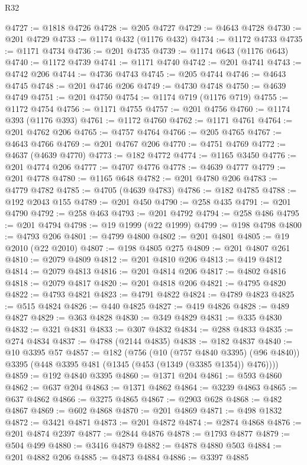 \begin{lexlean}{R32}
\begin{coremodule}
@4727 := @1818 @4726
@4728 := @205 @4727
@4729 := @4643 @4728
@4730 := @201 @4729
@4733 := @1174 @432 (@1176 @432)
@4734 := @1172 @4733
@4735 := @1171 @4734
@4736 := @201 @4735
@4739 := @1174 @643 (@1176 @643)
@4740 := @1172 @4739
@4741 := @1171 @4740
@4742 := @201 @4741
@4743 := @4742 @206
@4744 := @4736 @4743
@4745 := @205 @4744
@4746 := @4643 @4745
@4748 := @201 @4746 @206
@4749 := @4730 @4748
@4750 := @4639 @4749
@4751 := @201 @4750
@4754 := @1174 @719 (@1176 @719)
@4755 := @1172 @4754
@4756 := @1171 @4755
@4757 := @201 @4756
@4760 := @1174 @393 (@1176 @393)
@4761 := @1172 @4760
@4762 := @1171 @4761
@4764 := @201 @4762 @206
@4765 := @4757 @4764
@4766 := @205 @4765
@4767 := @4643 @4766
@4769 := @201 @4767 @206
@4770 := @4751 @4769
@4772 := @4637 (@4639 @4770)
@4773 := @182 @4772
@4774 := @1165 @3450
@4776 := @201 @4774 @206
@4777 := @4707 @4776
@4778 := @4639 @4777
@4779 := @201 @4778
@4780 := @1165 @648
@4782 := @201 @4780 @206
@4783 := @4779 @4782
@4785 := @4705 (@4639 @4783)
@4786 := @182 @4785
@4788 := @192 @2043 @155
@4789 := @201 @450
@4790 := @258 @435
@4791 := @201 @4790
@4792 := @258 @463
@4793 := @201 @4792
@4794 := @258 @486
@4795 := @201 @4794
@4798 := @19 @1999 (@22 @1999)
@4799 := @198 @4798
@4800 := @4793 @206
@4801 := @4799 @4800
@4802 := @201 @4801
@4805 := @19 @2010 (@22 @2010)
@4807 := @198 @4805 @275
@4809 := @201 @4807 @261
@4810 := @2079 @4809
@4812 := @201 @4810 @206
@4813 := @419 @4812
@4814 := @2079 @4813
@4816 := @201 @4814 @206
@4817 := @4802 @4816
@4818 := @2079 @4817
@4820 := @201 @4818 @206
@4821 := @4795 @4820
@4822 := @4793 @4821
@4823 := @4791 @4822
@4824 := @4789 @4823
@4825 := @515 @4824
@4826 := @440 @4825
@4827 := @419 @4826
@4828 := @489 @4827
@4829 := @363 @4828
@4830 := @349 @4829
@4831 := @335 @4830
@4832 := @321 @4831
@4833 := @307 @4832
@4834 := @288 @4833
@4835 := @274 @4834
@4837 := @4788 (@2144 @4835)
@4838 := @182 @4837
@4840 := @10 @3395 @57
@4857 := @182
    (@756
      (@10 (@757 @4840 @3395) (@96 @4840))
      @3395
      (@448 @3395 @481 (@1345 (@453 (@1349 (@3385 @1354)) @476))))
@4859 := @192 @4840 @3395
@4860 := @1371 @204
@4861 := @593 @4860
@4862 := @637 @204
@4863 := @1371 @4862
@4864 := @3239 @4863
@4865 := @637 @4862
@4866 := @3275 @4865
@4867 := @2903 @628
@4868 := @482 @4867
@4869 := @602 @4868
@4870 := @201 @4869
@4871 := @498 @1832
@4872 := @3421 @4871
@4873 := @201 @4872
@4874 := @2874 @4868
@4876 := @201 @4874 @2397
@4877 := @2844 @4876
@4878 := @1793 @4877
@4879 := @504 @499
@4880 := @3416 @4879
@4882 := @4878 @4880 @503
@4884 := @201 @4882 @206
@4885 := @4873 @4884
@4886 := @3397 @4885

\end{coremodule}
\end{lexlean}
